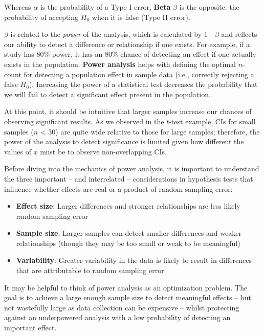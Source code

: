 \documentclass[
]{book}
\providecommand{\tightlist}{%
  \setlength{\itemsep}{0pt}\setlength{\parskip}{0pt}}
\begin{document}
Whereas \(\alpha\) is the probability of a Type I error, \textbf{Beta} \(\beta\) is the opposite: the probability of accepting \(H_0\) when it is false (Type II error).

\(\beta\) is related to the \emph{power} of the analysis, which is calculated by 1 - \(\beta\) and reflects our ability to detect a difference or relationship if one exists. For example, if a study has 80\% power, it has an 80\% chance of detecting an effect if one actually exists in the population. \textbf{Power analysis} helps with defining the optimal \(n\)-count for detecting a population effect in sample data (i.e., correctly rejecting a false \(H_0\)). Increasing the power of a statistical test decreases the probability that we will fail to detect a significant effect present in the population.

At this point, it should be intuitive that larger samples increase our chances of observing significant results. As we observed in the \(t\)-test example, CIs for small samples (\(n\) \textless{} 30) are quite wide relative to those for large samples; therefore, the power of the analysis to detect significance is limited given how different the values of \(x\) must be to observe non-overlapping CIs.

Before diving into the mechanics of power analysis, it is important to understand the three important -- and interrelated -- considerations in hypothesis tests that influence whether effects are real or a product of random sampling error:

\begin{itemize}
\tightlist
\item
  \textbf{Effect size}: Larger differences and stronger relationships are less likely random sampling error
\item
  \textbf{Sample size}: Larger samples can detect smaller differences and weaker relationships (though they may be too small or weak to be meaningful)
\item
  \textbf{Variability}: Greater variability in the data is likely to result in differences that are attributable to random sampling error
\end{itemize}

It may be helpful to think of power analysis as an optimization problem. The goal is to achieve a large enough sample size to detect meaningful effects -- but not wastefully large as data collection can be expensive -- whilst protecting against an underpowered analysis with a low probability of detecting an important effect.
\end{document}

